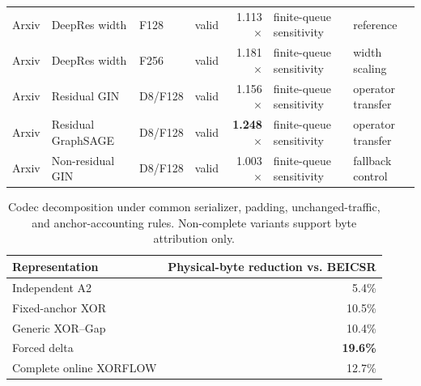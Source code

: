 \documentclass[10pt,conference]{IEEEtran}
\newcommand{\sys}{\textsc{XORFLOW}}
\newcommand{\beicsr}{\textsc{BEICSR}}
\begin{document}
\begin{table}[t]
\begin{tabular}{lllrrll}
Arxiv & DeepRes width & F128 & valid & 1.113$\times$ & finite-queue sensitivity & reference \\
Arxiv & DeepRes width & F256 & valid & 1.181$\times$ & finite-queue sensitivity & width scaling \\
Arxiv & Residual GIN & D8/F128 & valid & 1.156$\times$ & finite-queue sensitivity & operator transfer \\
Arxiv & Residual GraphSAGE & D8/F128 & valid & \textbf{1.248$\times$} & finite-queue sensitivity & operator transfer \\
Arxiv & Non-residual GIN & D8/F128 & valid & 1.003$\times$ & finite-queue sensitivity & fallback control \\
\bottomrule
\end{tabular}
\end{table}

\begin{table}[t]
\centering
\caption{Codec decomposition under common serializer, padding, unchanged-traffic, and anchor-accounting rules. Non-complete variants support byte attribution only.}
\label{tab:s-codec}
\footnotesize
\begin{tabular}{lr}
\toprule
Representation & Physical-byte reduction vs. \beicsr{} \\
\midrule
Independent A2 & 5.4\% \\
Fixed-anchor XOR & 10.5\% \\
Generic XOR--Gap & 10.4\% \\
Forced delta & \textbf{19.6\%} \\
Complete online \sys{} & 12.7\% \\
\bottomrule
\end{tabular}
\end{table}
\end{document}
